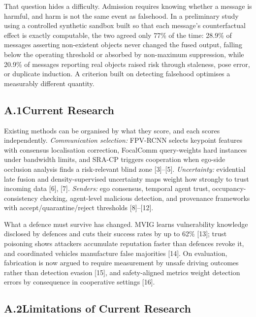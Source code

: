 \documentclass[11pt]{article}
\begin{document}
That question hides a difficulty. Admission requires knowing whether a message
is harmful, and harm is not the same event as falsehood. In a preliminary study
using a controlled synthetic sandbox built so that each message's
counterfactual effect is exactly computable, the two agreed only 77\% of the
time: 28.9\% of messages asserting non-existent objects never changed the fused
output, falling below the operating threshold or absorbed by non-maximum
suppression, while 20.9\% of messages reporting real objects raised risk
through staleness, pose error, or duplicate induction. A criterion built on
detecting falsehood optimises a measurably different quantity.

\subsection{A.1\quad Current Research}

Existing methods can be organised by what they score, and each scores
independently. \emph{Communication selection:} FPV-RCNN selects keypoint
features with consensus localisation correction, FocalComm query-weights hard
instances under bandwidth limits, and SRA-CP triggers cooperation when ego-side
occlusion analysis finds a risk-relevant blind zone [3]--[5].
\emph{Uncertainty:} evidential late fusion and density-supervised uncertainty
maps weight how strongly to trust incoming data [6], [7]. \emph{Senders:} ego
consensus, temporal agent trust, occupancy-consistency checking, agent-level
malicious detection, and provenance frameworks with accept/quarantine/reject
thresholds [8]--[12].

What a defence must survive has changed. MVIG learns vulnerability knowledge
disclosed by defences and cuts their success rates by up to 62\% [13]; trust
poisoning shows attackers accumulate reputation faster than defences revoke it,
and coordinated vehicles manufacture false majorities [14]. On evaluation,
fabrication is now argued to require measurement by unsafe driving outcomes
rather than detection evasion [15], and safety-aligned metrics weight detection
errors by consequence in cooperative settings [16].

\subsection{A.2\quad Limitations of Current Research}
\end{document}
